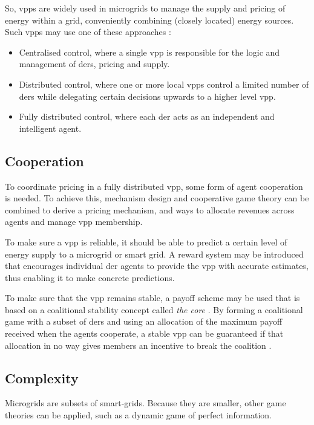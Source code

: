 So, \acp{vpp} are widely used in microgrids to manage the supply and pricing of energy within a grid, conveniently combining (closely located) energy sources. Such \acp{vpp} may use one of these approaches \cite{NikonowiczMilewski2012}:
\begin{itemize}
	\item Centralised control, where a single \ac{vpp} is responsible for the logic and management of \acp{der}, pricing and supply.
	\item Distributed control, where one or more local \acp{vpp} control a limited number of \acp{der} while delegating certain decisions upwards to a higher level \ac{vpp}.
	\item Fully distributed control, where each \ac{der} acts as an independent and intelligent agent.
\end{itemize}

\subsection{Cooperation}
\label{microgrids:cooperation}
To coordinate pricing in a fully distributed \ac{vpp}, some form of agent cooperation is needed. To achieve this, mechanism design and cooperative game theory can be combined to derive a pricing mechanism, and ways to allocate revenues across agents and manage \ac{vpp} membership\cite{ChalkiadakisRobuKotaEtAl2011}. 

To make sure a \ac{vpp} is reliable, it should be able to predict a certain level of energy supply to a microgrid or smart grid. A reward system may be introduced that encourages individual \ac{der} agents to provide the \ac{vpp} with accurate estimates, thus enabling it to make concrete predictions.

To make sure that the \ac{vpp} remains stable, a payoff scheme may be used that is based on a coalitional stability concept called \emph{the core} \cite{Myerson1991}. By forming a coalitional game with a subset of \acp{der} and using an allocation of the maximum payoff received when the agents cooperate, a stable \ac{vpp} can be guaranteed if that allocation in no way gives members an incentive to break the coalition \cite{ChalkiadakisRobuKotaEtAl2011, YeungPoonWu1999, SaadHanPoor2011}.

\subsection{Complexity}
Microgrids are subsets of smart-grids. Because they are smaller, other game theories can be applied, such as a dynamic game of perfect information. 

